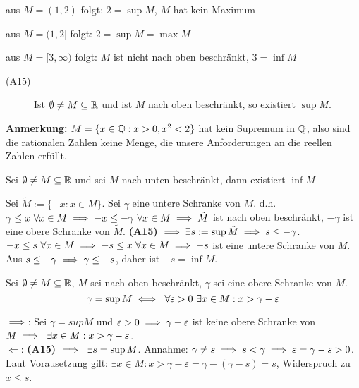 \documentclass[a4paper,twoside,DIV15,BCOR12mm]{scrbook}
\begin{document}
\begin{beispiele}
\item aus $M = (1,2)$ folgt: $2 = \sup{M}$, $M$ hat kein Maximum
\item aus $M = (1,2]$ folgt: $2 = \sup{M} = \max{M}$
\item aus $M = [3,\infty)$ folgt: $M$ ist nicht nach oben beschränkt, $3 = \inf{M}$
\end{beispiele}

\begin{axiom}
\begin{description}
\item[(A15)] Ist $\emptyset \ne M \subseteq \mathbb{R}$ und ist $M$ nach oben beschränkt, so existiert $\sup{M}$.
\end{description}
\end{axiom}

\textbf{Anmerkung:} $M = \{x\in\mathbb{Q}: x > 0, x^2 < 2\}$ hat kein Supremum in $\mathbb{Q}$, also sind die rationalen Zahlen keine Menge, die unsere Anforderungen an die reellen Zahlen erfüllt.

\begin{satz}
Sei $ \emptyset \ne M \subseteq \mathbb{R}$ und sei $M$ nach unten beschränkt, dann existiert $\inf{M}$
\end{satz}

\begin{beweis} Sei $\tilde M := \{ -x : x\in M\}$. Sei $\gamma$ eine untere Schranke von $M$. d.h. $\gamma \le x \ \forall x \in M \implies -x \le -\gamma \ \forall x \in M \implies \tilde M $ ist nach oben beschränkt, $-\gamma$ ist eine obere Schranke von $\tilde M$. \textbf{(A15)} $\implies \exists s := \sup{\tilde M} \implies s \le - \gamma$. $-x \le s \ \forall x \in M \folgt -s \le x \ \forall x \in M \folgt -s $ ist eine untere Schranke von $M$. Aus $s \le -\gamma \implies \gamma \le -s$, daher ist $-s = \inf{M}$.
\end{beweis}

\begin{satz}
Sei $\emptyset \ne M \subseteq \mathbb{R}$, $M$ sei nach oben beschränkt, $\gamma$ sei eine obere Schranke von $M$.
\[ \gamma = \sup{M} \equizu \ \forall\varepsilon > 0 \ \exists x \in M: x > \gamma - \varepsilon \]
\end{satz}

\begin{beweis} \glqq$\implies$\grqq: Sei $\gamma = sup{M}$ und $\varepsilon > 0 \implies \gamma - \varepsilon$ ist keine obere Schranke von $M \implies \ \exists x\in M: x > \gamma - \varepsilon$. \\
 \glqq$\Leftarrow$\grqq: \textbf{(A15)} $\implies \ \exists s = \sup{M}$. Annahme: $\gamma \ne s \implies s < \gamma \implies \varepsilon = \gamma - s > 0$. Laut Vorausetzung gilt: $\exists x \in M: x > \gamma - \varepsilon = \gamma - (\gamma - s) = s$, Widerspruch zu $x \le s$.
\end{beweis}
\end{document}
